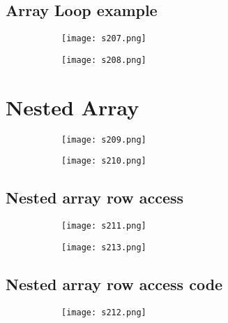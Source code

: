 \documentclass[8pt]{extreport}
\begin{document}
\subsection{Array Loop example}
\begin{figure}[H]
\centering
\begin{subfigure}[b]{0.4\linewidth}
\texttt{[image: s207.png]}
\end{subfigure}
\begin{subfigure}[b]{0.4\linewidth}
\texttt{[image: s208.png]}
\end{subfigure}
\end{figure}

\section{Nested Array}
\begin{figure}[H]
\centering
\begin{subfigure}[b]{0.4\linewidth}
\texttt{[image: s209.png]}
\end{subfigure}
\begin{subfigure}[b]{0.4\linewidth}
\texttt{[image: s210.png]}
\end{subfigure}
\end{figure}
\subsection{Nested array row access}
\begin{figure}[H]
\centering
\begin{subfigure}[b]{0.4\linewidth}
\texttt{[image: s211.png]}
\end{subfigure}
\begin{subfigure}[b]{0.4\linewidth}
\texttt{[image: s213.png]}
\end{subfigure}
\end{figure}

\subsection{Nested array row access code}
\begin{figure}[H]
\centering
\begin{subfigure}[b]{0.4\linewidth}
\texttt{[image: s212.png]}
\end{subfigure}
\end{figure}
\end{document}
